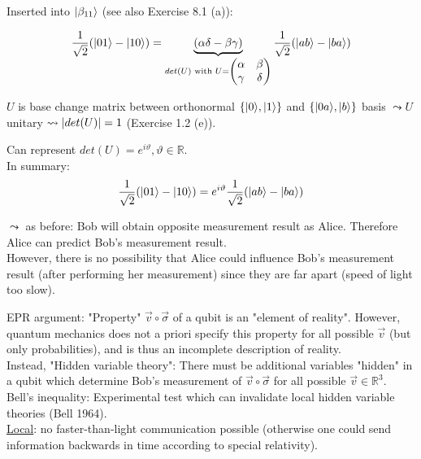 \begin{itemize}
    Inserted into $\lvert\beta_{11}\rangle$ (see also Exercise 8.1 (a)):

    \begin{equation*}
        \frac{1}{\sqrt{2}} (\ket{01} - \ket{10}) 
            = \underbrace{(\alpha \delta - \beta \gamma)}_{
                    det(U) \text{ with } U = \begin{pmatrix*} 
                        \alpha & \beta \\ \gamma & \delta 
                    \end{pmatrix*}
                } \frac{1}{\sqrt{2}} (\ket{ab} - \ket{ba})
    \end{equation*}

    $U$ is base change matrix between orthonormal $\{ \lvert0\rangle, \lvert1\rangle \}$ and  
    $\{ \lvert0a\rangle, \lvert b\rangle \}$ basis $\leadsto U$ unitary $\leadsto \lvert det(U)\rvert = 1$ (Exercise 1.2 (e)).

    Can represent $det(U) = e^{i \vartheta}, \vartheta \in \mathbb{R}$. \\
    In summary: 
    \begin{equation*}
        \frac{1}{\sqrt{2}} (\lvert01\rangle - \lvert10\rangle) 
            = e^{i \vartheta} \frac{1}{\sqrt{2}}(\lvert ab\rangle - \lvert ba\rangle)
    \end{equation*}

    $\leadsto$ as before: Bob will obtain opposite measurement result as Alice.
    Therefore Alice can predict Bob's measurement result. \\
    However, there is no possibility that Alice could influence Bob's measurement result 
    (after performing her measurement) since they are far apart (speed of light too slow).
\end{itemize}

EPR argument: "Property" $\vec{v} \circ \vec{\sigma}$ of a qubit is an "element of reality".
However, quantum mechanics does not a priori specify this property for all possible $\vec{v}$ 
(but only probabilities), and is thus an incomplete description of reality. \\
Instead, "Hidden variable theory": There must be additional variables "hidden" in a qubit which
determine Bob's measurement of $\vec{v} \circ \vec{\sigma}$ for all possible $\vec{v} \in \mathbb{R}^3$. \\

Bell's inequality: Experimental test which can invalidate local hidden variable theories
(Bell 1964). \\

\underline{Local}: no faster-than-light communication possible 
(otherwise one could send information backwards in time according to special relativity). \\ 

